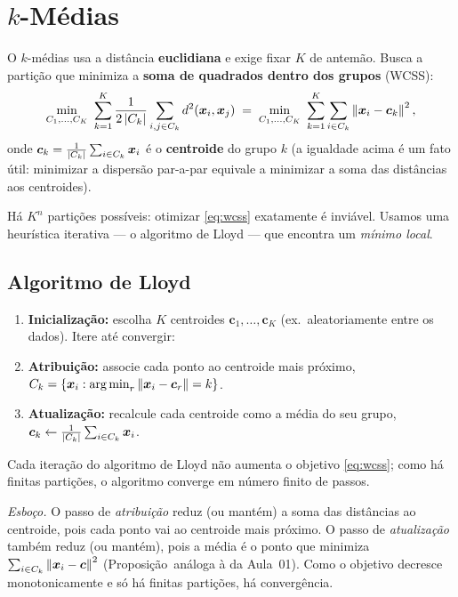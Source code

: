 \documentclass[11pt,a4paper]{article}
\begin{document}
\section{$k$-Médias}
O $k$-médias usa a distância \textbf{euclidiana} e exige fixar $K$ de antemão. Busca
a partição que minimiza a \textbf{soma de quadrados dentro dos grupos} (WCSS):
\begin{equation}\label{eq:wcss}
  \min_{C_1,\dots,C_K}\ \sum_{k=1}^{K} \frac{1}{2\left\lvert C_k \right\rvert}
     \sum_{i,j\in C_k} d^2(\bm{x}_i,\bm{x}_j)
  \;=\; \min_{C_1,\dots,C_K}\ \sum_{k=1}^{K}\sum_{i\in C_k}\left\lVert \bm{x}_i-\bm{c}_k \right\rVert^2,
\end{equation}
onde $\bm{c}_k=\frac{1}{\left\lvert C_k \right\rvert}\sum_{i\in C_k}\bm{x}_i$ é o \textbf{centroide} do
grupo $k$ (a igualdade acima é um fato útil: minimizar a dispersão par-a-par
equivale a minimizar a soma das distâncias aos centroides).

\begin{atencao}
Há $K^n$ partições possíveis: otimizar \eqref{eq:wcss} exatamente é inviável. Usamos
uma heurística iterativa --- o algoritmo de Lloyd --- que encontra um \emph{mínimo
local}.
\end{atencao}

\subsection{Algoritmo de Lloyd}
\begin{tcolorbox}[colback=cinzaclaro,colframe=azulufrj,title={Algoritmo de Lloyd ($k$-médias)}]
\begin{enumerate}[leftmargin=1.4cm,nosep]
  \item \textbf{Inicialização:} escolha $K$ centroides $\bm{c}_1,\dots,\bm{c}_K$
        (ex.\ aleatoriamente entre os dados). Itere até convergir:
  \item \textbf{Atribuição:} associe cada ponto ao centroide mais próximo,
        $C_k=\{\x_i:\argmin_r \norm{\x_i-\bm{c}_r}=k\}$.
  \item \textbf{Atualização:} recalcule cada centroide como a média do seu grupo,
        $\bm{c}_k\leftarrow \frac{1}{\left\lvert C_k \right\rvert}\sum_{i\in C_k}\bm{x}_i$.
\end{enumerate}
\end{tcolorbox}

\begin{proposicao}
Cada iteração do algoritmo de Lloyd não aumenta o objetivo \eqref{eq:wcss}; como há
finitas partições, o algoritmo converge em número finito de passos.
\end{proposicao}
\noindent\emph{Esboço.} O passo de \emph{atribuição} reduz (ou mantém) a soma das distâncias
ao centroide, pois cada ponto vai ao centroide mais próximo. O passo de
\emph{atualização} também reduz (ou mantém), pois a média é o ponto que minimiza
$\sum_{i\in C_k}\left\lVert \bm{x}_i-\bm{c} \right\rVert^2$ (Proposição~análoga à da Aula~01). Como o
objetivo decresce monotonicamente e só há finitas partições, há convergência.
\end{document}
